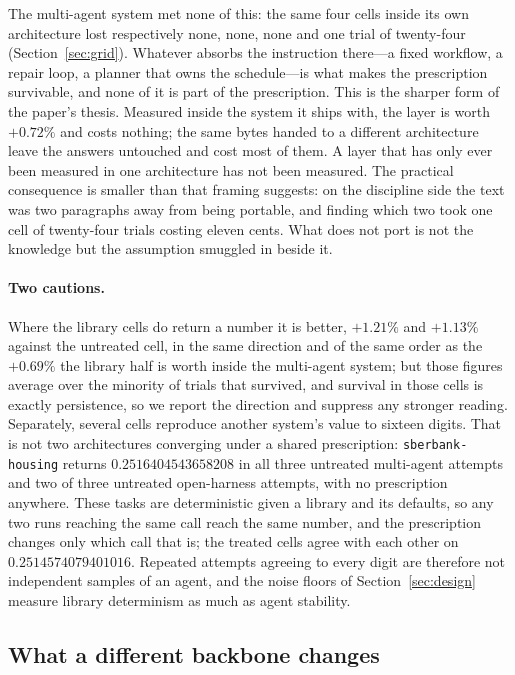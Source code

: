 The multi-agent system met none of this: the same four cells inside its own
architecture lost respectively none, none, none and one trial of twenty-four
(Section~\ref{sec:grid}). Whatever absorbs the instruction there---a fixed
workflow, a repair loop, a planner that owns the schedule---is what makes the
prescription survivable, and none of it is part of the prescription. This is the
sharper form of the paper's thesis. Measured inside the system it ships with, the
layer is worth $+0.72\%$ and costs nothing; the same bytes handed to a different
architecture leave the answers untouched and cost most of them. A layer that has
only ever been measured in one architecture has not been measured. The practical
consequence is smaller than that framing suggests: on the discipline side the
text was two paragraphs away from being portable, and finding which two took one
cell of twenty-four trials costing eleven cents. What does not port is not the
knowledge but the assumption smuggled in beside it.

\paragraph{Two cautions.} Where the library cells do return a number it is
better, $+1.21\%$ and $+1.13\%$ against the untreated cell, in the same direction
and of the same order as the $+0.69\%$ the library half is worth inside the
multi-agent system; but those figures average over the minority of trials that
survived, and survival in those cells is exactly persistence, so we report the
direction and suppress any stronger reading. Separately, several cells reproduce
another system's value to sixteen digits. That is not two architectures
converging under a shared prescription: \texttt{sberbank-housing} returns
$0.2516404543658208$ in all three untreated multi-agent attempts and two of three
untreated open-harness attempts, with no prescription anywhere. These tasks are
deterministic given a library and its defaults, so any two runs reaching the same
call reach the same number, and the prescription changes only which call that is;
the treated cells agree with each other on $0.2514574079401016$. Repeated
attempts agreeing to every digit are therefore not independent samples of an
agent, and the noise floors of Section~\ref{sec:design} measure library
determinism as much as agent stability.

\subsection{What a different backbone changes}
\label{sec:modelaxis}

